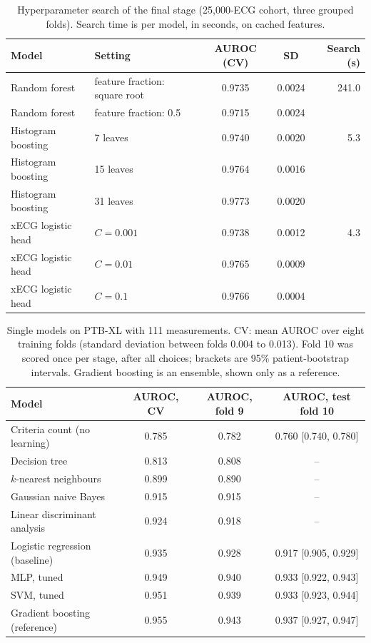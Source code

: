 \documentclass[letterpaper,11pt]{article}
\begin{document}
\begin{table}[H]
  \centering
  \caption{Hyperparameter search of the final stage (25,000-ECG cohort, three grouped folds). Search time is per model, in seconds, on cached features.}
  \label{tab:search5}
  \small
  \begin{tabular}{llccr}
    \toprule
    Model & Setting & AUROC (CV) & SD & Search (s) \\
    \midrule
    Random forest & feature fraction: square root & 0.9735 & 0.0024 & 241.0 \\
    Random forest & feature fraction: 0.5 & 0.9715 & 0.0024 & \\
    Histogram boosting & 7 leaves & 0.9740 & 0.0020 & 5.3 \\
    Histogram boosting & 15 leaves & 0.9764 & 0.0016 & \\
    Histogram boosting & 31 leaves & 0.9773 & 0.0020 & \\
    xECG logistic head & $C = 0.001$ & 0.9738 & 0.0012 & 4.3 \\
    xECG logistic head & $C = 0.01$ & 0.9765 & 0.0009 & \\
    xECG logistic head & $C = 0.1$ & 0.9766 & 0.0004 & \\
    \bottomrule
  \end{tabular}
\end{table}

\begin{table}[H]
  \centering
  \caption{Single models on PTB-XL with 111 measurements. CV: mean AUROC over eight training folds (standard deviation between folds 0.004 to 0.013). Fold 10 was scored once per stage, after all choices; brackets are 95\% patient-bootstrap intervals. Gradient boosting is an ensemble, shown only as a reference.}
  \label{tab:single}
  \begin{tabular}{lccc}
    \toprule
    Model & AUROC, CV & AUROC, fold 9 & AUROC, test fold 10 \\
    \midrule
    Criteria count (no learning)   & 0.785  & 0.782  & 0.760 [0.740, 0.780] \\
    Decision tree                  & 0.813 & 0.808 & -- \\
    $k$-nearest neighbours         & 0.899 & 0.890 & -- \\
    Gaussian naive Bayes           & 0.915 & 0.915 & -- \\
    Linear discriminant analysis   & 0.924 & 0.918 & -- \\
    Logistic regression (baseline) & 0.935 & 0.928 & 0.917 [0.905, 0.929] \\
    MLP, tuned                     & 0.949 & 0.940 & 0.933 [0.922, 0.943] \\
    SVM, tuned                     & 0.951 & 0.939 & 0.933 [0.923, 0.944] \\
    \midrule
    Gradient boosting (reference)  & 0.955 & 0.943 & 0.937 [0.927, 0.947] \\
    \bottomrule
  \end{tabular}
\end{table}
\end{document}

